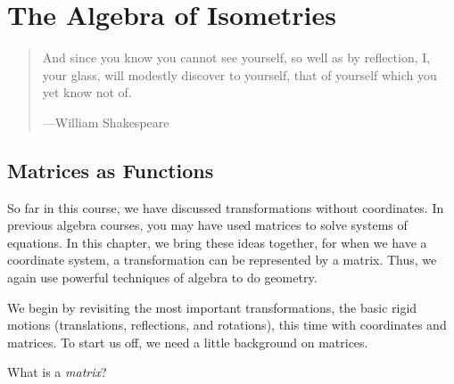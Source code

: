 \chapter{The Algebra of Isometries}

\begin{quote}
And since you know you cannot see yourself, so well as by reflection,
I, your glass, will modestly discover to yourself, that of yourself
which you yet know not of.

\hfill---William Shakespeare
\end{quote}




\section{Matrices as Functions}
So far in this course, we have discussed transformations without coordinates.  
In previous algebra courses, you may have used matrices to solve systems of equations.  
In this chapter, we bring these ideas together, for when we have a coordinate system, 
a transformation can be represented by a matrix.  
Thus, we again use powerful techniques of algebra to do geometry.  

We begin by revisiting the most important transformations, the basic rigid motions 
(translations, reflections, and rotations), this time with coordinates and matrices. 
To start us off, we need a little background on
matrices.

\begin{question} 
What is a \textit{matrix}?
\end{question}
\QM

